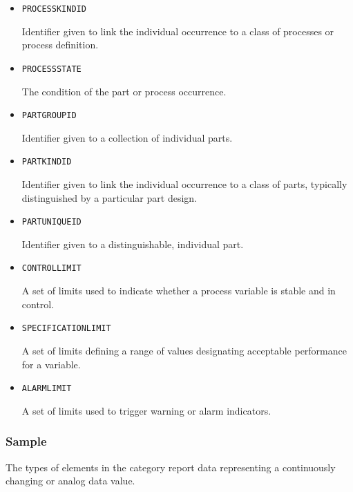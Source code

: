 \begin{itemize}
\item \texttt{PROCESS\textunderscore KIND\textunderscore ID}  

Identifier given to link the individual occurrence to a class of processes or process definition.



\item \texttt{PROCESS\textunderscore STATE}  

The condition of the part or process occurrence.


\item \texttt{PART\textunderscore GROUP\textunderscore ID}  

Identifier given to a collection of individual parts. 


\item \texttt{PART\textunderscore KIND\textunderscore ID}  

Identifier given to link the individual occurrence to a class of parts, typically distinguished by a particular part design.


\item \texttt{PART\textunderscore UNIQUE\textunderscore ID}  

Identifier given to a distinguishable, individual part. 


\item \texttt{CONTROL\textunderscore LIMIT}  

A set of limits used to indicate whether a process variable is stable and in control.


\item \texttt{SPECIFICATION\textunderscore LIMIT}  

A set of limits defining a range of values designating acceptable performance for a variable.


\item \texttt{ALARM\textunderscore LIMIT}  

A set of limits used to trigger warning or alarm indicators.

\end{itemize}


\subsubsection{Sample}
\label{sec:Sample}



The types of  elements in the  category report data representing a continuously changing or analog data value.

